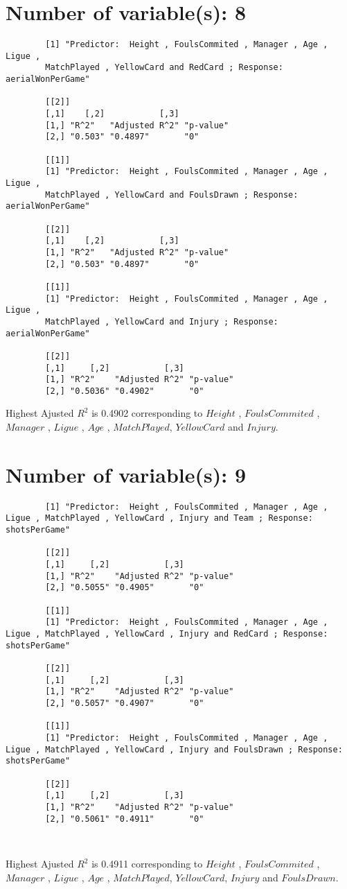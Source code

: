 \documentclass[12pt]{article}
\begin{document}
	\section{Number of variable(s): 8}
	\begin{verbatim}
		[1] "Predictor:  Height , FoulsCommited , Manager , Age , Ligue , 
		MatchPlayed , YellowCard and RedCard ; Response:  aerialWonPerGame"
		
		[[2]]
		[,1]    [,2]           [,3]     
		[1,] "R^2"   "Adjusted R^2" "p-value"
		[2,] "0.503" "0.4897"       "0"      
		
		[[1]]
		[1] "Predictor:  Height , FoulsCommited , Manager , Age , Ligue , 
		MatchPlayed , YellowCard and FoulsDrawn ; Response:  aerialWonPerGame"
		
		[[2]]
		[,1]    [,2]           [,3]     
		[1,] "R^2"   "Adjusted R^2" "p-value"
		[2,] "0.503" "0.4897"       "0"      
		
		[[1]]
		[1] "Predictor:  Height , FoulsCommited , Manager , Age , Ligue , 
		MatchPlayed , YellowCard and Injury ; Response:  aerialWonPerGame"
		
		[[2]]
		[,1]     [,2]           [,3]     
		[1,] "R^2"    "Adjusted R^2" "p-value"
		[2,] "0.5036" "0.4902"       "0"    
	\end{verbatim}
		Highest Ajusted $ R^2 $ is 0.4902 corresponding to $Height$ , $FoulsCommited$ , $Manager$ , $Ligue$ , $Age$ , 
		$ MatchPlayed $, $ YellowCard $ and $ Injury $.
	
	\section{Number of variable(s): 9}
	\begin{verbatim}
		[1] "Predictor:  Height , FoulsCommited , Manager , Age , Ligue , MatchPlayed , YellowCard , Injury and Team ; Response:  shotsPerGame"
		
		[[2]]
		[,1]     [,2]           [,3]     
		[1,] "R^2"    "Adjusted R^2" "p-value"
		[2,] "0.5055" "0.4905"       "0"      
		
		[[1]]
		[1] "Predictor:  Height , FoulsCommited , Manager , Age , Ligue , MatchPlayed , YellowCard , Injury and RedCard ; Response:  shotsPerGame"
		
		[[2]]
		[,1]     [,2]           [,3]     
		[1,] "R^2"    "Adjusted R^2" "p-value"
		[2,] "0.5057" "0.4907"       "0"      
		
		[[1]]
		[1] "Predictor:  Height , FoulsCommited , Manager , Age , Ligue , MatchPlayed , YellowCard , Injury and FoulsDrawn ; Response:  shotsPerGame"
		
		[[2]]
		[,1]     [,2]           [,3]     
		[1,] "R^2"    "Adjusted R^2" "p-value"
		[2,] "0.5061" "0.4911"       "0"      
		
		
	\end{verbatim}
		Highest Ajusted $ R^2 $ is 0.4911 corresponding to $Height$ , $FoulsCommited$ , $Manager$ , $Ligue$ , $Age$ , 
		$ MatchPlayed $, $ YellowCard $, $ Injury $ and $ FoulsDrawn $.
	
\end{document}
